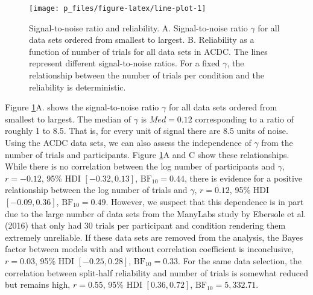 \documentclass[
  man,floatsintext]{apa6}
\begin{document}
\begin{figure}

{\centering \texttt{[image: p\_files/figure-latex/line-plot-1]} 

}

\caption{Signal-to-noise ratio and reliability. A. Signal-to-noise ratio \(\gamma\) for all data sets ordered from smallest to largest. B. Reliability as a function of number of trials for all data sets in ACDC. The lines represent different signal-to-noise ratios. For a fixed \(\gamma\), the relationship between the number of trials per condition and the reliability is deterministic.}\label{fig:line-plot}
\end{figure}

Figure \ref{fig:line-plot}A. shows the signal-to-noise ratio \(\gamma\) for all data sets ordered from smallest to largest. The median of \(\gamma\) is \(Med = 0.12\) corresponding to a ratio of roughly 1 to 8.5. That is, for every unit of signal there are 8.5 units of noise. Using the ACDC data sets, we can also assess the independence of \(\gamma\) from the number of trials and participants. Figure \ref{fig:line-plot}A and C show these relationships. While there is no correlation between the log number of participants and \(\gamma\), \(r = -0.12\), 95\% HDI \([-0.32, 0.13]\), \(\mathrm{BF}_{\textrm{10}} = 0.44\), there is evidence for a positive relationship between the log number of trials and \(\gamma\), \(r = 0.12\), 95\% HDI \([-0.09, 0.36]\), \(\mathrm{BF}_{\textrm{10}} = 0.49\). However, we suspect that this dependence is in part due to the large number of data sets from the ManyLabs study by Ebersole et al. (2016) that only had 30 trials per participant and condition rendering them extremely unreliable. If these data sets are removed from the analysis, the Bayes factor between models with and without correlation coefficient is inconclusive, \(r = 0.03\), 95\% HDI \([-0.25, 0.28]\), \(\mathrm{BF}_{\textrm{10}} = 0.33\). For the same data selection, the correlation between split-half reliability and number of trials is somewhat reduced but remains high, \(r = 0.55\), 95\% HDI \([0.36, 0.72]\), \(\mathrm{BF}_{\textrm{10}} = 5,332.71\).
\end{document}
